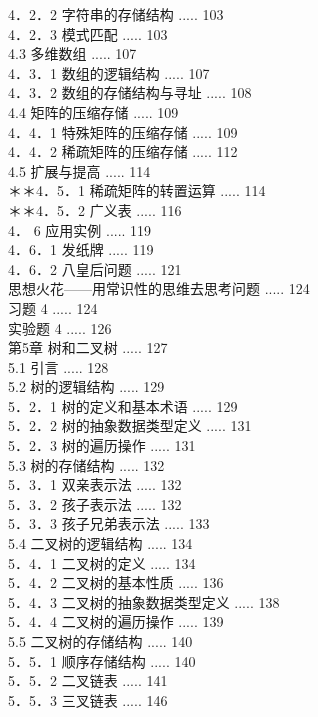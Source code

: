 \documentclass[10pt]{article}
\begin{document}
4．2．2 字符串的存储结构 ..... 103\\
4．2．3 模式匹配 ..... 103\\
4.3 多维数组 ..... 107\\
4．3．1 数组的逻辑结构 ..... 107\\
4．3．2 数组的存储结构与寻址 ..... 108\\
4.4 矩阵的压缩存储 ..... 109\\
4．4．1 特殊矩阵的压缩存储 ..... 109\\
4．4．2 稀疏矩阵的压缩存储 ..... 112\\
4.5 扩展与提高 ..... 114\\
＊＊4．5．1 稀疏矩阵的转置运算 ..... 114\\
＊＊4．5．2 广义表 ..... 116\\
4． 6 应用实例 ..... 119\\
4．6．1 发纸牌 ..... 119\\
4．6．2 八皇后问题 ..... 121\\
思想火花——用常识性的思维去思考问题 ..... 124\\
习题 4 ..... 124\\
实验题 4 ..... 126\\
第5章 树和二叉树 ..... 127\\
5.1 引言 ..... 128\\
5.2 树的逻辑结构 ..... 129\\
5．2．1 树的定义和基本术语 ..... 129\\
5．2．2 树的抽象数据类型定义 ..... 131\\
5．2．3 树的遍历操作 ..... 131\\
5.3 树的存储结构 ..... 132\\
5．3．1 双亲表示法 ..... 132\\
5．3．2 孩子表示法 ..... 132\\
5．3．3 孩子兄弟表示法 ..... 133\\
5.4 二叉树的逻辑结构 ..... 134\\
5．4．1 二叉树的定义 ..... 134\\
5．4．2 二叉树的基本性质 ..... 136\\
5．4．3 二叉树的抽象数据类型定义 ..... 138\\
5．4．4 二叉树的遍历操作 ..... 139\\
5.5 二叉树的存储结构 ..... 140\\
5．5．1 顺序存储结构 ..... 140\\
5．5．2 二叉链表 ..... 141\\
5．5．3 三叉链表 ..... 146\\
\end{document}
